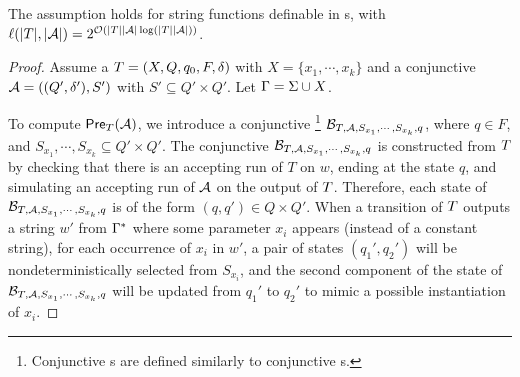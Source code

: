 \begin{lemma}\label{lem-2pt}
The \prerec{} assumption holds for string functions definable in \PPT{}s, with $\ell(|T|, |\mathcal{A}|) = 2^{\mathcal{O}(|T||\mathcal{A}|\log (|T||\mathcal{A}|))}$.
\end{lemma}

\begin{proof}
Assume a \PPT{} $T=(X, Q, q_0, F, \delta)$ with $X = \{x_1,\cdots, x_k\}$ and a conjunctive \FA{} $\mathcal{A} = ((Q', \delta'), S')$ with $S' \subseteq Q' \times Q'$. %
Let $\Gamma = \Sigma \cup X$.

To compute $\textsf{Pre}_{T}(\mathcal{A})$, we introduce a conjunctive \FFA{}\footnote{Conjunctive \FFA{}s are defined similarly to conjunctive \FA{}s.} $\mathcal{B}_{T, \mathcal{A}, S_{x_1}, \cdots, S_{x_k}, q}$, %
%
where  $q \in F$, and  $S_{x_1}, \cdots, S_{x_k} \subseteq Q' \times Q'$.   
The conjunctive \FFA{} $\mathcal{B}_{T, \mathcal{A}, S_{x_1}, \cdots, S_{x_k}, q}$ is constructed from $T$  by checking that there is an accepting run of $T$ on $w$, ending at the state $q$, and simulating an accepting run of $\mathcal{A}$ on the output of $T$. Therefore, each state of $\mathcal{B}_{T, \mathcal{A}, S_{x_1}, \cdots, S_{x_k}, q}$ is of the form $(q,q') \in Q \times Q'$. 
When a transition of $T$ outputs a string $w'$ from $\Gamma^*$ where some parameter $x_i$ appears (instead of a constant string), for each occurrence of $x_i$ in $w'$, a pair of states $(q_1', q_2')$ will be nondeterministically selected from $S_{x_i}$, and the second component of the state of $\mathcal{B}_{T, \mathcal{A}, S_{x_1}, \cdots, S_{x_k}, q}$ will be updated from $q_1'$ to $q_2'$ to mimic a possible instantiation of $x_i$.  




\end{proof}

